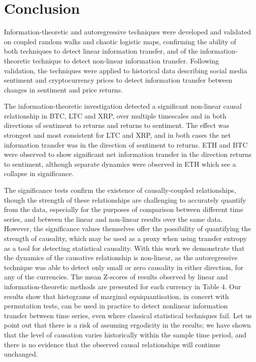 \documentclass[]{rsos}%
\begin{document}
 
\clearpage
\section{Conclusion} \label{s.conclusions}

Information-theoretic and autoregressive techniques were developed and validated on coupled random walks and chaotic logistic maps, confirming the ability of both techniques to detect linear information transfer, and of the information-theoretic technique to detect non-linear information transfer. Following validation, the techniques were applied to historical data describing social media sentiment and cryptocurrency prices to detect information transfer between changes in sentiment and price returns. 

The information-theoretic investigation detected a significant non-linear causal relationship in BTC, LTC and XRP, over multiple timescales and in both directions of sentiment to returns and returns to sentiment. The effect was strongest and most consistent for LTC and XRP, and in both cases the net information transfer was in the direction of sentiment to returns. ETH and BTC were observed to show significant net information transfer in the direction returns to sentiment, although separate dynamics were observed in ETH which see a collapse in significance. 

The significance tests confirm the existence of causally-coupled relationships, though the strength of these relationships are challenging to accurately quantify from the data, especially for the purposes of comparison between different time series, and between the linear and non-linear results over the same data. However, the significance values themselves offer the possibility of quantifying the strength of causality, which may be used as a proxy when using transfer entropy as a tool for detecting statistical causality. With this work we demonstrate that the dynamics of the causative relationship is non-linear, as the autoregressive technique was able to detect only small or zero causality in either direction, for any of the currencies. The mean Z-scores of results observed by linear and information-theoretic methods are presented for each currency in Table {\color{blue}4}. Our results show that histograms of marginal equiquantisation, in concert with permutation tests, can be used in practice to detect nonlinear information transfer between time series, even where classical statistical techniques fail. Let us point out that there is a risk of assuming ergodicity in the results; we have shown that the level of causation varies historically within the sample time period, and there is no evidence that the observed causal relationships will continue unchanged. 
\end{document}
